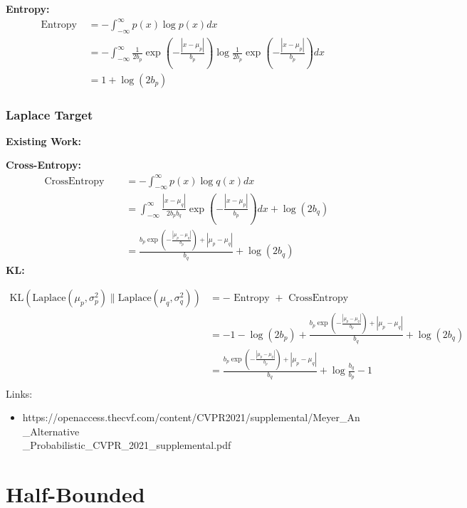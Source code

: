 \documentclass{article}
\begin{document}
\noindent \textbf{Entropy:}
$$ \begin{aligned} \text { Entropy }&=-\int_{-\infty}^{\infty} p(x) \log p(x) d x\\&=-\int_{-\infty}^{\infty}\frac{1}{2 b_{p}} \exp \left(-\frac{\left|x-\mu_{p}\right|}{b_{p}}\right) \log \frac{1}{2 b_{p}} \exp \left(-\frac{\left|x-\mu_{p}\right|}{b_{p}}\right) d x&\\&=1+\log \left(2 b_{p}\right)
\end{aligned} $$

\subsubsection{Laplace Target}

\noindent \textbf{Existing Work:}

\noindent \textbf{Cross-Entropy:}
$$ \begin{aligned} \text { CrossEntropy }
\quad &=-\int_{-\infty}^{\infty} p(x) \log q(x) d x \\
\quad &=\int_{-\infty}^{\infty} \frac{\left|x-\mu_{q}\right|}{2 b_{p} b_{q}} \exp \left(-\frac{\left|x-\mu_{p}\right|}{b_{p}}\right) d x+\log \left(2 b_{q}\right)\\&=\frac{b_{p} \exp \left(-\frac{\left|\mu_{p}-\mu_{q}\right|}{b_{p}}\right)+\left|\mu_{p}-\mu_{q}\right|}{b_{q}}+\log \left(2 b_{q}\right)
\end{aligned}
 $$
\noindent \textbf{KL:}

$$ \begin{aligned}\mathrm{KL}\left(\mathrm{Laplace}\left(\mu_{p}, \sigma_{p}^{2}\right) \| \mathrm{Laplace}\left(\mu_{q}, \sigma_{q}^{2}\right)\right)&=-\text { Entropy }+\text{ CrossEntropy }\\&=-1-\log \left(2 b_{p}\right)+\frac{b_{p} \exp \left(-\frac{\left|\mu_{p}-\mu_{q}\right|}{b_{p}}\right)+\left|\mu_{p}-\mu_{q}\right|}{b_{q}}+\log \left(2 b_{q}\right)\\&=\frac{b_{p} \exp \left(-\frac{\left|\mu_{p}-\mu_{q}\right|}{b_{p}}\right)+\left|\mu_{p}-\mu_{q}\right|}{b_{q}}+\log \frac{b_{q}}{b_{p}}-1\\
\end{aligned}
$$
Links:
\begin{itemize}
    \item  https://openaccess.thecvf.com/content/CVPR2021/supplemental/Meyer\_An\_Alternative\\\_Probabilistic\_CVPR\_2021\_supplemental.pdf
\end{itemize}
\section{Half-Bounded}
\end{document}
